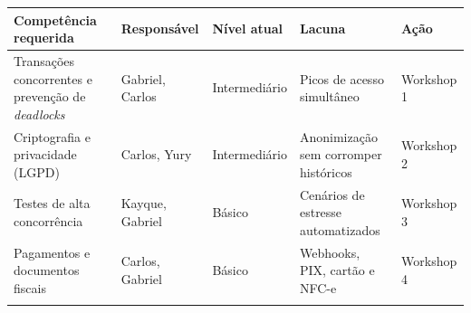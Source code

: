 {\footnotesize
\begin{tabularx}{\textwidth}{>{\hsize\sloppy\arraybackslash}X L{2.59cm} C{2.29cm} >{\hsize\sloppy\arraybackslash}X L{1.85cm}}
\toprule
{}
\textbf{Competência requerida} & \textbf{Responsável} & \textbf{Nível atual} & \textbf{Lacuna} & \textbf{Ação} \\
\midrule
{}
Transações concorrentes e prevenção de \emph{deadlocks} & Gabriel, Carlos & Intermediário & Picos de acesso simultâneo & Workshop 1 \\
\midrule
Criptografia e privacidade (LGPD) & Carlos, Yury & Intermediário & Anonimização sem corromper históricos & Workshop 2 \\
\midrule
Testes de alta concorrência & Kayque, Gabriel & Básico & Cenários de estresse automatizados & Workshop 3 \\
\midrule
Pagamentos e documentos fiscais & Carlos, Gabriel & Básico & Webhooks, PIX, cartão e NFC-e & Workshop 4 \\
\bottomrule
\end{tabularx}%
}
